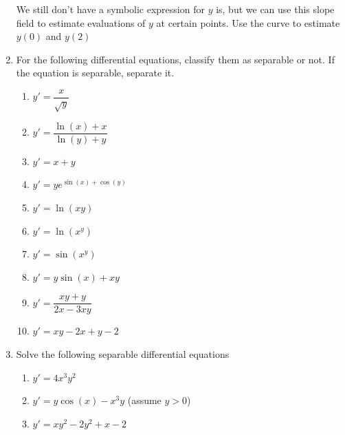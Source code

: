 \documentclass[11pt]{article}
\begin{document}
\begin{enumerate}
        We still don't have a symbolic expression for $y$ is, but we can use this slope field to estimate evaluations of $y$ at certain points. Use the curve to estimate $y(0)$ and $y(2)$
        \newpage
        \item For the following differential equations, classify them as separable or not. If the equation is separable, separate it.
        \begin{enumerate}
            \item $y'=\dfrac{x}{\sqrt{y}}$\vfill
            \item $y'=\dfrac{\ln(x)+x}{\ln(y)+y}$\vfill
            \item $y'=x+y$\vfill
            \item $y'=ye^{\sin(x)+\cos(y)}$\vfill
            \item $y'=\ln(xy)$\vfill
            \newpage
            \item $y'=\ln(x^{y})$\vfill
            \item $y'=\sin(x^{y})$\vfill
            \item $y'=y\sin(x)+xy$\vfill
            \item $y'=\dfrac{xy+y}{2x-3xy}$\vfill
            \item $y'=xy-2x+y-2$\vfill
        \end{enumerate}
        \newpage
        \item Solve the following separable differential equations
        \begin{enumerate}
            \item $y'=4x^{3}y^{2}$\vfill
            \item $y'=y\cos(x)-x^{3}y$ (assume $y>0$)\vfill
            \item $y'=xy^2-2y^2+x-2$ \vfill
        \end{enumerate}
        
    \end{enumerate}
\end{document}
